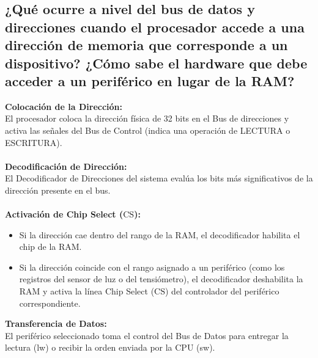 \documentclass[12pt, a4paper]{article}
\begin{document}
\subsection{¿Qué ocurre a nivel del bus de datos y direcciones cuando el procesador accede a una dirección de memoria que corresponde a un dispositivo? ¿Cómo sabe el hardware que debe acceder a un periférico en lugar de la RAM?}
   \textbf{Colocación de la Dirección:}\\ 
     El procesador coloca la dirección física de 32 bits en el Bus de direcciones y activa las señales del Bus de Control (indica una operación de LECTURA o ESCRITURA).\\\\
    \textbf{Decodificación de Dirección:} \\
    El Decodificador de Direcciones del sistema evalúa los bits más significativos de la dirección presente en el bus.\\\\
    \textbf{Activación de Chip Select ($\text{CS}$):} 
    \begin{itemize}
        \item Si la dirección cae dentro del rango de la RAM, el decodificador habilita el chip de la RAM.
        \item Si la dirección coincide con el rango asignado a un periférico (como los registros del sensor de luz o del tensiómetro), el decodificador deshabilita la RAM y activa la línea Chip Select ($\text{CS}$) del controlador del periférico correspondiente.
    \end{itemize}
    \textbf{Transferencia de Datos:}\\
    El periférico seleccionado toma el control del Bus de Datos para entregar la lectura (lw) o recibir la orden enviada por la CPU (sw).
    
\end{document}
